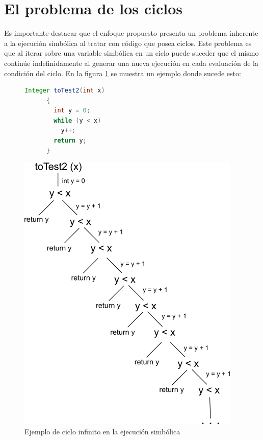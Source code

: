 \documentclass{llncs}
\begin{document}
\section{El problema de los ciclos}\label{sec:loopProblem}
Es importante destacar que el enfoque propuesto presenta un problema inherente a la ejecución simbólica al tratar con código que posea ciclos.
Este problema es que al iterar sobre una variable simbólica en un ciclo puede suceder que el mismo continúe indefinidamente al generar una nueva
ejecución en cada e\-va\-lua\-ción de la condición del ciclo. En la figura \ref{cicloInf} se muestra un ejemplo donde sucede esto:


\begin{figure}[hbt!]
   \centering
    \begin{minipage}[H]{0.5\textwidth}
      \begin{lstlisting}[language=Java]
	Integer toTest2(int x)
	  {
	    int y = 0;
	    while (y < x)
	      y++;
	    return y;
	  }
      \end{lstlisting}
    \end{minipage}
  \begin{minipage}[H]{0.45\textwidth}
    \centering
    \includegraphics[width=0.95\textwidth]{cicloInf}
  \end{minipage}
  \caption{Ejemplo de ciclo infinito en la ejecución simbólica}
  \label{cicloInf}
\end{figure}
\end{document}
